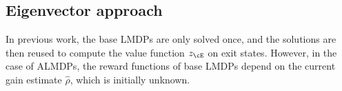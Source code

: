 \subsection{Eigenvector approach}

In previous work, the base LMDPs are only solved once, and the solutions are then reused to compute the value function $z_\cE$ on exit states. However, in the case of ALMDPs, the reward functions of base LMDPs depend on the current gain estimate $\hat\rho$, which is initially unknown. 



